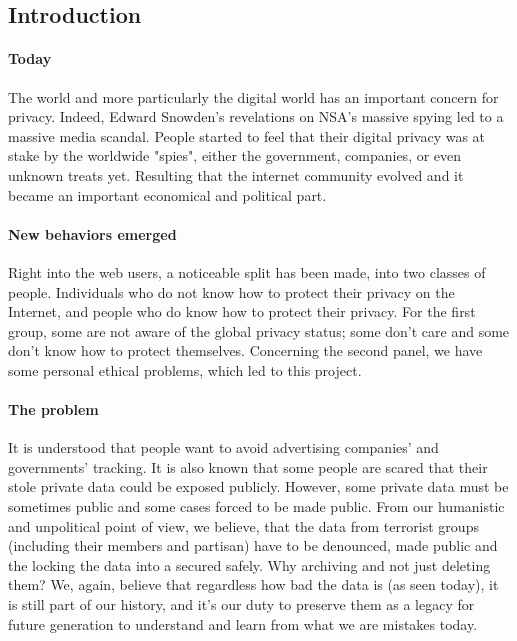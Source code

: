 
\subsection{Introduction}
\paragraph{Today} The world and more particularly the digital world has an important concern for privacy. Indeed, Edward Snowden's revelations on NSA's massive spying\cite{EdwardSnowdenArchive} led to a massive media scandal. People started to feel that their digital privacy was at stake by the worldwide "spies", either the government, companies, or even unknown treats yet. Resulting that the internet community evolved and it became an important economical and political part.

\paragraph{New behaviors emerged} Right into the web users, a noticeable split has been made, into two classes of people. Individuals who do not know how to protect their privacy on the Internet, and people who do know how to protect their privacy. For the first group, some are not aware of the global privacy status; some don't care and some don't know how to protect themselves. Concerning the second panel, we have some personal ethical problems, which led to this project.

\paragraph{The problem} It is understood that people want to avoid advertising companies' and governments' tracking. It is also known that some people are scared that their stole private data could be exposed publicly. However, some private data must be sometimes public and some cases forced to be made public. From our humanistic and unpolitical point of view, we believe, that the data from terrorist groups (including their members and partisan) have to be denounced, made public and the locking the data into a secured safely. Why archiving and not just deleting them? We, again, believe that regardless how bad the data is (as seen today), it is still part of our history, and it's our duty to preserve them as a legacy for future generation to understand and learn from what we are mistakes today.

